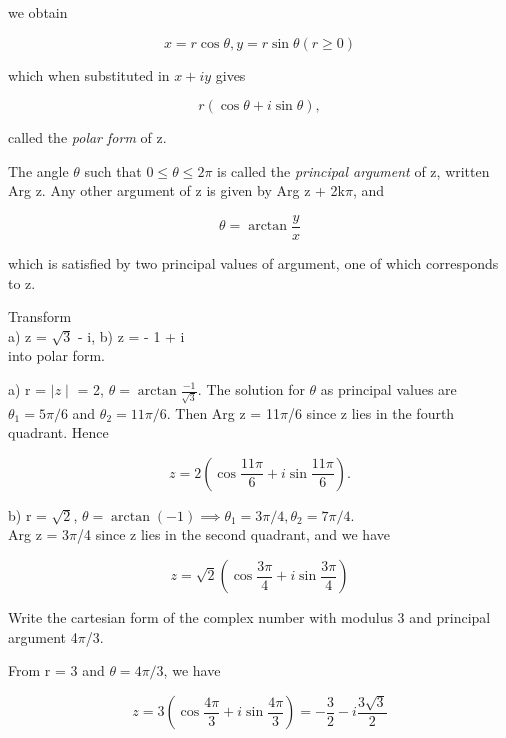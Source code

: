 \documentclass[11pt]{amsbook}
\begin{document}

we obtain

		\[
			x = r \cos \theta, y = r \sin \theta (r \geq 0)
		\]

which when substituted in $x + iy$ gives
		
		\[
			r(\cos \theta + i \sin \theta),
		\]

called the \textit{polar form} of z.
\par The angle $\theta$ such that $0 \leq \theta \leq 2\pi$ is called the \textit{principal argument} of z, written Arg z. Any other argument of z is given by Arg  z + 2k$\pi$, and
		
		\[
			\theta = \arctan{\frac{y}{x}}
		\]

which is satisfied by two principal values of argument, one of which corresponds to z.

\begin{exmp} {Transform \\a) z = $\sqrt{3}$ - i, b) z = - 1 + i \\ into polar form.}
\end{exmp}

\begin{hSolution}

a) r = $\mid z\mid$ = 2, $\theta = \arctan{\frac{-1}{\sqrt{3}}}$. The solution for $\theta$ as principal values are $\theta_1 = 5\pi / 6$ and $\theta_2 = 11\pi / 6$. Then Arg z = 11$\pi$/6 since z lies in the fourth quadrant. Hence
		
		\[
			z = 2(\cos{\frac{11\pi}{6}} + i \sin{\frac{11\pi}{6}}).
		\]

b) r = $\sqrt{2}$, $\theta = \arctan{(-1)} \implies \theta_1 = 3\pi/4, \theta_2 = 7\pi/4$. \\
Arg z = 3$\pi$/4 since z lies in the second quadrant, and we have
		
		\[
		 	z = \sqrt{2}(\cos{\frac{3\pi}{4}} + i\sin{\frac{3\pi}{4}})
		\] 

\end{hSolution}

\begin{exmp}{Write the cartesian form of the complex number with modulus 3 and principal argument 4$\pi$/3.}
\end{exmp}

\begin{hSolution}

From r = 3 and $\theta = 4\pi/3$, we have
		
		\[
			z = 3(\cos{\frac{4\pi}{3}} + i \sin{\frac{4\pi}{3}}) = - \frac{3}{2} - i \frac{3\sqrt{3}}{2}
		\]

\end{hSolution}
\end{document}
